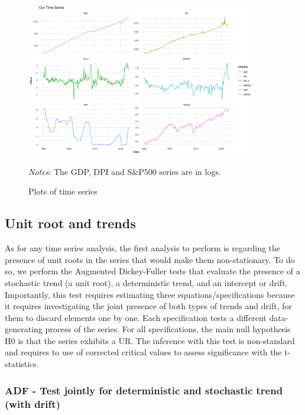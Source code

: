 \documentclass[hidelinks,12pts]{article}
\DeclareMathOperator{\1}{\mathbbm{1}}
\begin{document}
\begin{figure}[h!]
    \centering
    \includegraphics*[width =0.9\textwidth]{IMAGES/plot_series.png}
    \caption{Plots of time series}
    \label{fig:plot_series}
    \begin{minipage}{0.9\textwidth}
        \small{\emph{Notes}: The GDP, DPI and S\&P500 series are in logs. }
    \end{minipage}
\end{figure}



\subsection{Unit root and trends}

As for any time series analysis, the first analysis to perform is regarding the presence of unit roots in the series that would make them non-stationary. 
To do so, we perform the Augmented Dickey-Fuller tests that evaluate the presence of a stochastic trend (a unit root), a deterministic trend, and an intercept or drift. 
Importantly, this test requires estimating three equations/specifications because it requires investigating the joint presence of both types of trends and drift, for them to discard elements one by one.
Each specification tests a different data-generating process of the series. 
For all specifications, the main null hypothesis H0 is that the series exhibits a UR. 
The inference with this test is non-standard and requires to use of corrected critical values to assess significance with the t-statistics. 



\subsubsection{ADF - Test jointly for deterministic and stochastic trend (with drift)}
\end{document}
